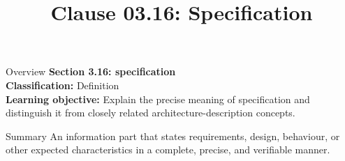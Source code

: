 \documentclass[10pt,letterpaper]{article}
\title{Clause 03.16: Specification}
\author{}
\date{}
\begin{document}
\maketitle
\begin{CornellOverviewBox}{Overview}
{\Large\bfseries\textcolor{CNavy}{Section 3.16: specification}}\\[3pt]
{\small\textbf{Classification:} Definition}\\
{\small\textbf{Learning objective:} Explain the precise meaning of specification and distinguish it from closely related architecture-description concepts.}
\end{CornellOverviewBox}
\vspace{3pt}

\begin{CornellNotesTable}
\end{CornellNotesTable}


\begin{CornellSummaryBox}{Summary}
An information part that states requirements, design, behaviour, or other expected characteristics in a complete, precise, and verifiable manner.
\end{CornellSummaryBox}
\end{document}
